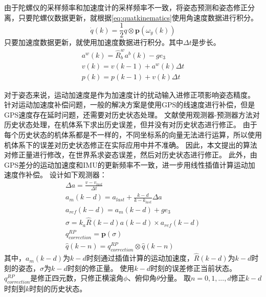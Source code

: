 \documentclass[
  type=master
]{gdutthesis}
\begin{document}
由于陀螺仪的采样频率和加速度计的采样频率不一致，将姿态预测和姿态修正分离，只要陀螺仪数据更新，就根据\autoref{eq:quatkinematics}使用角速度数据进行积分。
\begin{equation}\label{eq:quatint}
	\dot{q}(k)=\frac{1}{2} q \otimes \mathbf{p}(\omega_y(k))
\end{equation}
\vspace{1ex}只要加速度数据更新，就使用加速度数据进行积分。其中$\Delta t$是步长。
\begin{gather}\label{eq:pvpredict}
		a^w(k) = \hat{R}_b^w a^b(k) - g e_3\\
		v(k) = v(k-1) + a^w(k) \Delta t\\
		p(k) = p(k-1) + v(k) \Delta t 
\end{gather}

对于姿态来说，运动加速度是作为加速度计的扰动输入进修正项影响姿态精度。
针对运动加速度补偿问题，一般的解决方案是使用GPS的线速度进行补偿，但是GPS速度存在延时问题，还需要对历史状态处理。
文献\parencite{khosravian2014velocity}使用观测器-预测器方法对历史状态处理，在机体系下求出历史误差，但并没有对历史状态进行修正。
由于每个历史状态的机体系都是不一样的，不同坐标系的向量无法进行运算，所以使用机体系下的误差对历史状态修正在实际应用中并不准确。
因此，本文提出的算法对修正量进行修改，在世界系求姿态误差，然后对历史状态进行修正。
此外，由GPS差分的运动加速度和IMU的更新频率不一致，进一步用线性插值计算运动加速度作补偿。
\vspace{1ex}设计如下观测器：
\begin{gather}\label{eq:myrpcorrection}
		\Delta a = \frac{v - v_{last}}{\Delta t}\\
		a_m (k-d) = a_{last} + \frac{k-d}{k-k_{last}} \Delta a\\
		a_{ref} (k-d) = a_m (k-d) + g e_3\\
		\sigma = k_a \hat{R}(k-d) a(k-d) \times a_{ref}(k-d)\\
		q_{correction}^{RP} = \mathbf{p}(\sigma)\\
		\hat{q}(k-n) = q_{correction}^{RP} \otimes \hat{q}(k-n)
\end{gather}
其中，$a_m (k-d)$为$k-d$时刻通过插值计算的运动加速度，$\hat{R}(k-d)$为$k-d$时刻的姿态，$\sigma$为$k-d$时刻的修正量。
使用$k-d$时刻的误差修正当前状态。
$q_{correction}^{RP}$是修正四元数，只修正横滚角$\phi$、俯仰角$\theta$分量。
取$n=0,1,...,d$修正$k-d$时刻到$k$时刻的历史状态。
\end{document}
